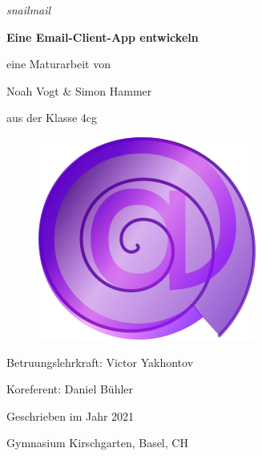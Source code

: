 \documentclass[a4paper,11pt]{article}
\begin{document}
\begin{titlepage}

	\centering
	
    \vspace{5cm}
    {\slshape\large snailmail \par}
    \vspace{0.1cm}
	{\huge\bfseries Eine Email-Client-App entwickeln \par}
	\vspace{0.5cm}
	{\Large eine Maturarbeit von \par}
	{\Large Noah Vogt \& Simon Hammer \par}
    {\Large aus der Klasse 4cg \par}
    \vspace{0.5cm}
   
    \begin{figure}[H]
        \centering
        \includegraphics[width=.7\textwidth]{../logo/version3d.png}
    \end{figure}
   
    \vspace{0.5cm}
    {\Large Betruungslehrkraft: Victor Yakhontov \par }
    {\Large Koreferent: Daniel Bühler \par}
    \vspace{0.5cm}
	{\large Geschrieben im Jahr 2021 \par}
    {\large Gymnasium Kirschgarten, Basel, CH \par}
	
\end{titlepage}
\end{document}
